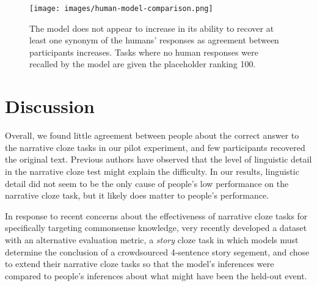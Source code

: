 \documentclass[10pt,a4paper]{article}
\begin{document}
% 
% 
% 
% 
% 

\begin{figure}
 \centering
 \texttt{[image: images/human-model-comparison.png]}
 \caption{The model does not appear to increase in its ability to recover at least one synonym of the humans' responses as agreement between participants increases. Tasks where no human responses were recalled by the model are given the placeholder ranking 100.}
 \label{fig:human-model-comparison}
\end{figure}

\section{Discussion}

Overall, we found little agreement between people about the correct answer to the narrative cloze tasks in our pilot experiment, and few participants recovered the original text. Previous authors have observed that the level of linguistic detail in the narrative cloze test might explain the difficulty. In our results, linguistic detail did not seem to be the only cause of people's low performance on the narrative cloze task, but it likely does matter to people's performance.


In response to recent concerns about the effectiveness of narrative cloze tasks for specifically targeting commonsense knowledge,  very recently developed a dataset with an alternative evaluation metric, a {\em story} cloze task in which models must determine the conclusion of a crowdsourced 4-sentence story segement, and  chose to extend their narrative cloze tasks so that the model's inferences were compared to people's inferences about what might have been the held-out event.
\end{document}
